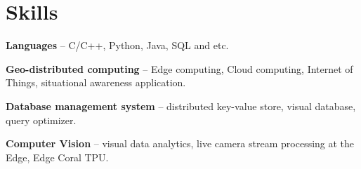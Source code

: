 
\section{Skills}
\begin{small}
	\parbox[t][][t]{\linewidth}{
		\textbf{Languages} -- C/C++, Python, Java, SQL and etc.
		\smallbreak
	}
	\parbox[t][][t]{\linewidth}{
		\textbf{Geo-distributed computing} -- Edge computing, Cloud computing, Internet of Things, situational awareness application.
		\smallbreak
	}
  \parbox[t][][t]{\linewidth}{
		\textbf{Database management system} -- distributed key-value store, visual database, query optimizer.
    \smallbreak
	}
  \parbox[t][][t]{\linewidth}{
		\textbf{Computer Vision} -- visual data analytics, live camera stream processing at the Edge, Edge Coral TPU.
    \smallbreak
	}
	\smallskip
\end{small}
